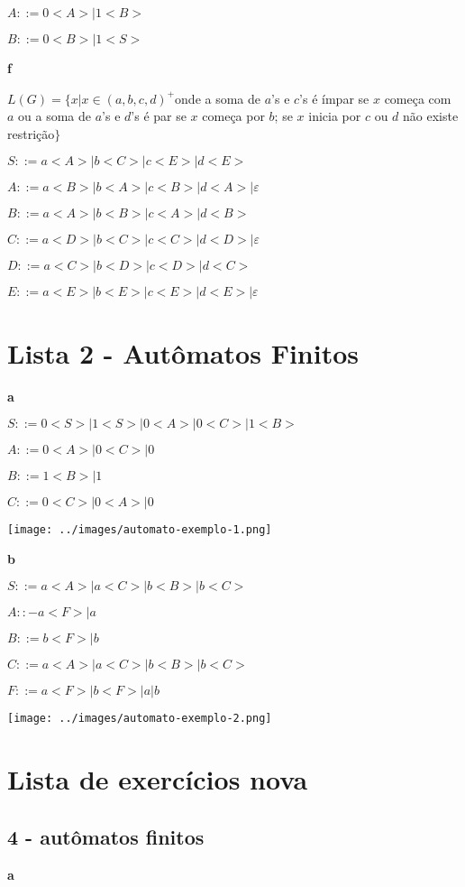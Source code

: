 \documentclass[ ]{article}
\begin{document}
	$A::= 0<A> | 1<B>$ %
	
	$B::= 0<B> | 1<S> $ %
	
	\textbf{f}
	
	$L(G) = \{ x | x \in (a,b,c,d)^+$onde a soma de $a$'s e $c$'s é ímpar se $x$ começa com $a$ ou a soma de $a$'s e $d$'s é par se $x$ começa por $b$; se $x$ inicia por $c$ ou $d$ não existe restrição$\}$
	
	$S::= a<A> | b<C> | c<E> | d<E> $ %
	
	$A::= a<B> | b<A> | c<B> | d<A> | \varepsilon$ %
	
	$B::= a<A> | b<B> | c<A> | d<B>$ %
	
	$C::= a<D> | b<C> | c<C> | d<D> | \varepsilon$ %

	$D::= a<C> | b<D> | c<D> | d<C>$ %
	
	$E::= a<E> | b<E> | c<E> | d<E> | \varepsilon$
	\section*{Lista 2 - Autômatos Finitos}
		\textbf{a}
		
		$S::= 0<S> | 1<S> | 0<A> | 0<C> | 1<B>$
		
		$A::= 0<A> | 0<C> | 0$
		
		$B::= 1<B> | 1$
		
		$C::= 0<C> | 0<A> | 0$
		
		\texttt{[image: ../images/automato-exemplo-1.png]}
		
		\textbf{b}
		
		$S::= a<A> | a<C> | b<B> | b<C>$
		
		$A::- a<F> | a$
		
		$B::= b<F> | b$
		
		$C::= a<A> | a<C> | b<B> | b<C>$
		
		$F::= a<F> | b<F> | a | b$
		
		\texttt{[image: ../images/automato-exemplo-2.png]}
		\newpage
	\section*{Lista de exercícios nova}
		\subsection{4 - autômatos finitos}

		\textbf{a}
		
\end{document}

